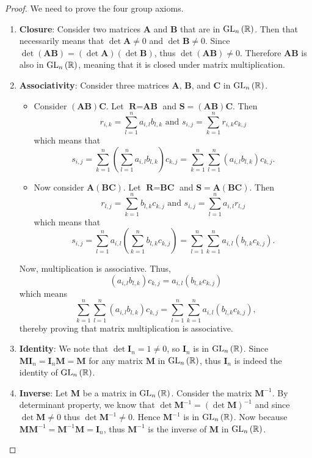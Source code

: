 \begin{proof}
    We need to prove the four group axioms.
    \begin{enumerate}
        \item \textbf{Closure}: Consider two matrices \textbf{A} and \textbf{B} that are in $\mathrm{GL}_{n}\left(\mathbb{R}\right)$. Then that necessarily means that $\det \textbf{A} \neq 0$ and $\det \textbf{B} \neq 0$. Since $\det(\textbf{AB}) = (\det \textbf{A})(\det \textbf{B})$, thus $\det(\textbf{AB}) \neq 0$. Therefore $\textbf{AB}$ is also in $\mathrm{GL}_{n}\left(\mathbb{R}\right)$, meaning that it is closed under matrix multiplication.
        \item \textbf{Associativity}: Consider three matrices \textbf{A}, \textbf{B}, and \textbf{C} in $\mathrm{GL}_{n}\left(\mathbb{R}\right)$.
        \begin{itemize}
            \item Consider $(\textbf{AB})\textbf{C}$. Let $\textbf{R} = \textbf{AB}$ and $\textbf{S} = (\textbf{AB})\textbf{C}$. Then
            \[
                r_{i,k} = \sum_{l=1}^n a_{i,l}b_{l,k} \text{ and } s_{i,j} = \sum_{k=1}^n r_{i,k}c_{k,j}
            \]
            which means that
            \[
                s_{i,j} = \sum_{k=1}^n \left(\sum_{l=1}^n a_{i,l}b_{l,k}\right)c_{k,j} = \sum_{k=1}^n \sum_{l=1}^n (a_{i,l}b_{l,k})c_{k,j}.
            \]
            \item Now consider $\textbf{A}(\textbf{BC})$. Let $\textbf{R} = \textbf{BC}$ and $\textbf{S} = \textbf{A}(\textbf{BC})$. Then
            \[
                r_{l,j} = \sum_{k=1}^nb_{l,k}c_{k,j} \text{ and } s_{i,j} = \sum_{l=1}^n a_{i,l}r_{l,j}
            \]
            which means that
            \[
                s_{i,j} = \sum_{l=1}^n a_{i,l}\left(\sum_{k=1}^nb_{l,k}c_{k,j}\right) = \sum_{l=1}^n\sum_{k=1}^n a_{i,l}(b_{l,k}c_{k,j}).
            \]
        \end{itemize}
        Now, multiplication is associative. Thus,
        \[
                (a_{i,l}b_{l,k})c_{k,j} = a_{i,l}(b_{l,k}c_{k,j})
        \]
        which means
        \[
            \sum_{k=1}^n \sum_{l=1}^n (a_{i,l}b_{l,k})c_{k,j} = \sum_{l=1}^n\sum_{k=1}^n a_{i,l}(b_{l,k}c_{k,j}),
        \]
        thereby proving that matrix multiplication is associative.
        \item \textbf{Identity}: We note that $\det \textbf{I}_n = 1 \neq 0$, so $\textbf{I}_n$ is in $\mathrm{GL}_{n}\left(\mathbb{R}\right)$. Since $\textbf{MI}_n = \textbf{I}_n\textbf{M} = \textbf{M}$ for any matrix $\textbf{M}$ in $\mathrm{GL}_{n}\left(\mathbb{R}\right)$, thus $\textbf{I}_n$ is indeed the identity of $\mathrm{GL}_{n}\left(\mathbb{R}\right)$.
        \item \textbf{Inverse}: Let \textbf{M} be a matrix in $\mathrm{GL}_{n}\left(\mathbb{R}\right)$. Consider the matrix $\textbf{M}^{-1}$. By determinant property, we know that $\det \textbf{M}^{-1} = \left(\det \textbf{M}\right)^{-1}$ and since $\det \textbf{M} \neq 0$ thus $\det \textbf{M}^{-1} \neq 0$. Hence $\textbf{M}^{-1}$ is in $\mathrm{GL}_{n}\left(\mathbb{R}\right)$. Now because $\textbf{MM}^{-1} = \textbf{M}^{-1}\textbf{M} = \textbf{I}_n$, thus $\textbf{M}^{-1}$ is the inverse of \textbf{M} in $\mathrm{GL}_{n}\left(\mathbb{R}\right)$.


\end{enumerate}
\end{proof}
